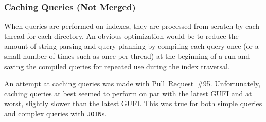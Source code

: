 \subsubsection{Caching Queries (Not Merged)}
When queries are performed on indexes, they are processed from
scratch by each thread for each directory. An obvious optimization
would be to reduce the amount of string parsing and query planning by
compiling each query once (or a small number of times such as once per
thread) at the beginning of a run and saving the compiled queries for
repeated use during the index traversal.

An attempt at caching queries was made with
\href{https://github.com/mar-file-system/GUFI/pull/95}{Pull~Request~\#95}.
Unfortunately, caching queries at best seemed to perform on par with
the latest GUFI and at worst, slightly slower than the latest
GUFI. This was true for both simple queries and complex queries with
\texttt{JOIN}s.

